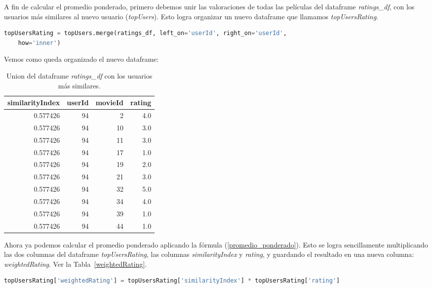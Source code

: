 \documentclass{uimppracticas}
\begin{document}
A fin de calcular el promedio ponderado, primero debemos unir las valoraciones de todas las películas del dataframe \textit{ratings\_df}, con los usuarios más similares al nuevo usuario (\textit{topUsers}). Esto logra organizar un nuevo dataframe que llamamos \textit{topUsersRating}.

\begin{lstlisting}[language=python, basicstyle=\small]
topUsersRating = topUsers.merge(ratings_df, left_on='userId', right_on='userId', 
	how='inner')
\end{lstlisting}

Vemos como queda organizado el nuevo dataframe:

\begin{table}[H]
	\centering
	\begin{tabular}{rrrr}
		\toprule
		similarityIndex &  userId &  movieId &  rating \\
		\midrule
		0.577426 &      94 &        2 &     4.0 \\
		0.577426 &      94 &       10 &     3.0 \\
		0.577426 &      94 &       11 &     3.0 \\
		0.577426 &      94 &       17 &     1.0 \\
		0.577426 &      94 &       19 &     2.0 \\
		0.577426 &      94 &       21 &     3.0 \\
		0.577426 &      94 &       32 &     5.0 \\
		0.577426 &      94 &       34 &     4.0 \\
		0.577426 &      94 &       39 &     1.0 \\
		0.577426 &      94 &       44 &     1.0 \\
		\bottomrule
	\end{tabular}
	\caption{Union del dataframe \textit{ratings\_df} con los usuarios más similares.}
	\label{ratings_similares}
\end{table}

Ahora ya podemos calcular el promedio ponderado aplicando la fórmula (\ref{promedio_ponderado}). Esto se logra sencillamente multiplicando las dos columnas del dataframe \textit{topUsersRating}, las columnas \textit{similarityIndex} y \textit{rating}, y guardando el resultado en una nueva columna: \textit{weightedRating}. Ver la Tabla~\ref{weightedRating}.

\begin{lstlisting}[language=python, basicstyle=\small]
topUsersRating['weightedRating'] = topUsersRating['similarityIndex'] * topUsersRating['rating']
\end{lstlisting} 
\end{document}
